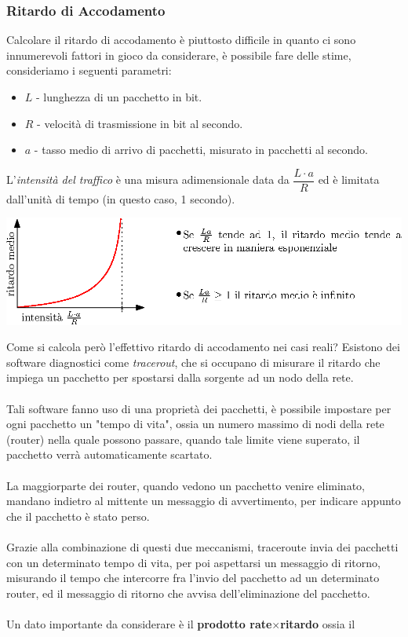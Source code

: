 \documentclass[12pt, letterpaper]{article}
\newcommand{\acc}{\\\hphantom{}\\}
\begin{document}
\subsubsection{Ritardo di Accodamento}
Calcolare il ritardo di accodamento è piuttosto difficile in quanto ci sono innumerevoli fattori in gioco da
considerare, è possibile fare delle stime, consideriamo i seguenti parametri:\begin{itemize}
    \item $L$ - lunghezza di un pacchetto in bit.
    \item $R$ - velocità di trasmissione in bit al secondo.
    \item $a$ - tasso medio di arrivo di pacchetti, misurato in pacchetti al secondo.
\end{itemize}
L'\textit{intensità del traffico} è una misura adimensionale data da $\dfrac{L\cdot a}{R}$ ed è limitata
dall'unità di tempo (in questo caso, 1 secondo).\begin{center}
    \includegraphics[width=\textwidth ]{images/traffico.eps}
\end{center}
Come si calcola però l'effettivo ritardo di accodamento nei casi reali? Esistono dei software
diagnostici come \textit{tracerout}, che si occupano di misurare il ritardo che impiega un pacchetto
per spostarsi dalla sorgente ad un nodo della rete. \acc Tali software fanno uso di una proprietà dei pacchetti,
è possibile impostare per ogni pacchetto un "tempo di vita", ossia un numero massimo di nodi della rete (router)
nella quale possono passare, quando tale limite viene superato, il pacchetto verrà automaticamente scartato.\acc
La maggiorparte dei router, quando vedono un pacchetto venire eliminato, mandano indietro al mittente un messaggio di
avvertimento, per indicare appunto che il pacchetto è stato perso.\acc Grazie alla combinazione di questi due meccanismi,
traceroute invia dei pacchetti con un determinato tempo di vita, per poi aspettarsi un messaggio di ritorno, misurando il
tempo che intercorre fra l'invio del pacchetto ad un determinato router, ed il messaggio di ritorno che avvisa dell'eliminazione
del pacchetto.\acc
Un dato importante da considerare è il \textbf{prodotto rate$\times$ritardo} ossia il
\end{document}
